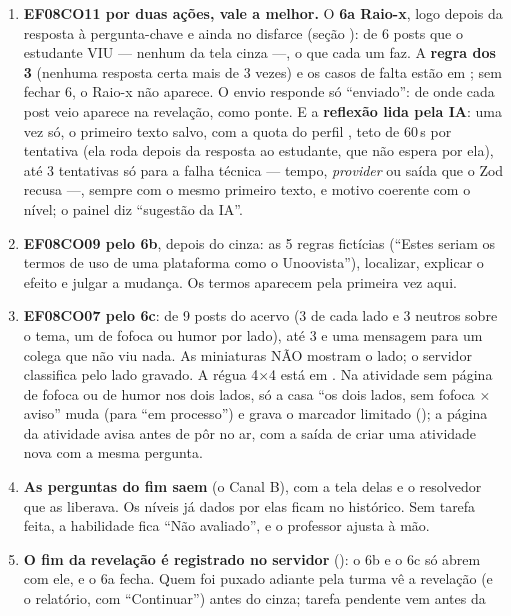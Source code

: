 \begin{enumerate}
  \item \textbf{EF08CO11 por duas ações, vale a melhor.} O \textbf{6a Raio-x},
    logo depois da resposta à pergunta-chave e ainda no disfarce (seção
    ): de 6 posts que o estudante VIU --- nenhum da tela cinza
    ---, o que cada um faz. A \textbf{regra dos 3} (nenhuma resposta certa
    mais de 3 vezes) e os casos de falta estão em
    ; sem fechar 6, o Raio-x não aparece. O envio
    responde só \enquote{enviado}: de onde cada post veio aparece na
    revelação, como ponte. E a \textbf{reflexão lida pela IA}: uma vez só, o
    primeiro texto salvo, com a quota do perfil , teto de 60\,s por tentativa (ela roda depois da resposta ao estudante, que não espera por ela), até 3 tentativas só para a falha técnica --- tempo, \emph{provider} ou saída que o Zod recusa ---, sempre com o mesmo primeiro texto, e
    motivo coerente com o nível; o painel diz \enquote{sugestão da IA}.
  \item \textbf{EF08CO09 pelo 6b}, depois do cinza: as 5 regras fictícias
    (\enquote{Estes seriam os termos de uso de uma plataforma como o
    Unoovista}), localizar, explicar o efeito e julgar a mudança. Os termos
    aparecem pela primeira vez aqui.
  \item \textbf{EF08CO07 pelo 6c}: de 9 posts do acervo (3 de cada lado e 3
    neutros sobre o tema, um de fofoca ou humor por lado), até 3 e uma
    mensagem para um colega que não viu nada. As miniaturas NÃO mostram o
    lado; o servidor classifica pelo lado gravado. A régua 4$\times$4 está em
    . Na atividade sem página de fofoca ou de humor
    nos dois lados, só a casa \enquote{os dois lados, sem fofoca $\times$
    aviso} muda (para \enquote{em processo}) e grava o marcador limitado
    (); a página da atividade avisa antes de pôr no ar, com a
    saída de criar uma atividade nova com a mesma pergunta.
  \item \textbf{As perguntas do fim saem} (o Canal B), com a tela delas e o
    resolvedor que as liberava. Os níveis já dados por elas ficam no
    histórico. Sem tarefa feita, a habilidade fica \enquote{Não avaliado}, e o
    professor ajusta à mão.
  \item \textbf{O fim da revelação é registrado no servidor}
    (): o 6b e o 6c só abrem com ele, e o 6a
    fecha. Quem foi puxado adiante pela turma vê a revelação (e o relatório,
    com \enquote{Continuar}) antes do cinza; tarefa pendente vem antes da

\end{enumerate}
